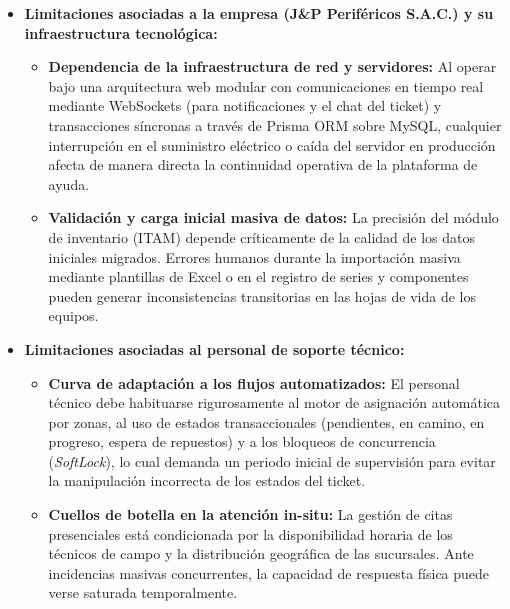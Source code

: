 \begin{itemize}
\item \textbf{Limitaciones asociadas a la empresa (J\&P Periféricos S.A.C.) y su infraestructura tecnológica:}
\begin{itemize}
\item \textbf{Dependencia de la infraestructura de red y servidores:} Al operar bajo una arquitectura web modular con comunicaciones en tiempo real mediante WebSockets (para notificaciones y el chat del ticket) y transacciones síncronas a través de Prisma ORM sobre MySQL, cualquier interrupción en el suministro eléctrico o caída del servidor en producción afecta de manera directa la continuidad operativa de la plataforma de ayuda.
\item \textbf{Validación y carga inicial masiva de datos:} La precisión del módulo de inventario (ITAM) depende críticamente de la calidad de los datos iniciales migrados. Errores humanos durante la importación masiva mediante plantillas de Excel o en el registro de series y componentes pueden generar inconsistencias transitorias en las hojas de vida de los equipos.
\end{itemize}

\item \textbf{Limitaciones asociadas al personal de soporte técnico:}
\begin{itemize}
    \item \textbf{Curva de adaptación a los flujos automatizados:} El personal técnico debe habituarse rigurosamente al motor de asignación automática por zonas, al uso de estados transaccionales (pendientes, en camino, en progreso, espera de repuestos) y a los bloqueos de concurrencia (\textit{SoftLock}), lo cual demanda un periodo inicial de supervisión para evitar la manipulación incorrecta de los estados del ticket.
    \item \textbf{Cuellos de botella en la atención in-situ:} La gestión de citas presenciales está condicionada por la disponibilidad horaria de los técnicos de campo y la distribución geográfica de las sucursales. Ante incidencias masivas concurrentes, la capacidad de respuesta física puede verse saturada temporalmente.
\end{itemize}


\end{itemize}
